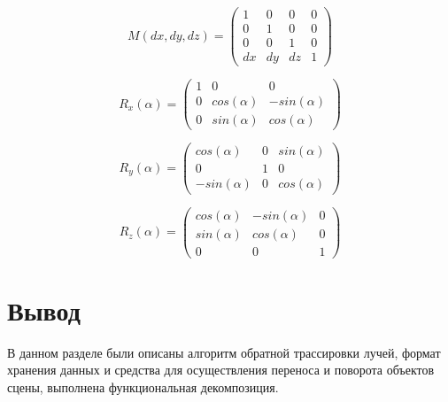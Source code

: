 \begin{equation}\label{eq:matrix_move}
	M(dx, dy, dz) = \begin{pmatrix}
		1 & 0 & 0 & 0 \\
		0 & 1 & 0 & 0 \\
		0 & 0 & 1 & 0 \\
		dx & dy & dz & 1
	\end{pmatrix}
\end{equation}

\begin{equation}\label{eq:matrix_rotate_x}
	R_x(\alpha) = \begin{pmatrix}
		1 & 0 & 0 \\
		0 & cos(\alpha) & -sin(\alpha) \\
		0 & sin(\alpha) & cos(\alpha)
	\end{pmatrix}
\end{equation}

\begin{equation}\label{eq:matrix_rotate_y}
	R_y(\alpha) = \begin{pmatrix}
		cos(\alpha) & 0 & sin(\alpha) \\
		0 & 1 & 0 \\
		-sin(\alpha) & 0 & cos(\alpha)
	\end{pmatrix}
\end{equation}

\begin{equation}\label{eq:matrix_rotate_z}
	R_z(\alpha) = \begin{pmatrix}
		cos(\alpha) & -sin(\alpha) & 0 \\
		sin(\alpha) & cos(\alpha) & 0 \\
		0 & 0 & 1
	\end{pmatrix}
\end{equation}

\section*{Вывод}

В данном разделе были описаны алгоритм обратной трассировки лучей, формат хранения данных и средства для осуществления переноса и поворота объектов сцены, выполнена функциональная декомпозиция.